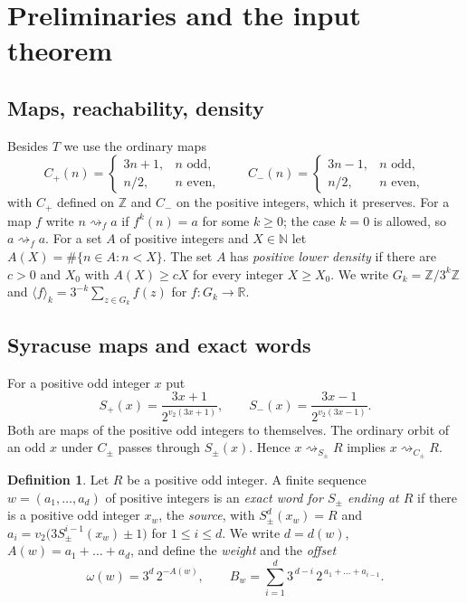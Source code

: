 \documentclass[11pt]{amsart}
\theoremstyle{definition}
\newtheorem{definition}[theorem]{Definition}
\theoremstyle{remark}
\newcommand{\Z}{\mathbb{Z}}
\newcommand{\N}{\mathbb{N}}
\newcommand{\R}{\mathbb{R}}
\newcommand{\Cp}{C_{+}}
\newcommand{\Cm}{C_{-}}
\newcommand{\Sp}{S_{+}}
\newcommand{\Sm}{S_{-}}
\newcommand{\reach}[1]{\mathrel{\rightsquigarrow_{#1}}}
\begin{document}
\section{Preliminaries and the input theorem}\label{sec:prelim}

\subsection{Maps, reachability, density}
Besides $T$ we use the ordinary maps
\[
  \Cp(n)=\begin{cases} 3n+1, & n\text{ odd},\\ n/2, & n\text{ even},\end{cases}\qquad
  \Cm(n)=\begin{cases} 3n-1, & n\text{ odd},\\ n/2, & n\text{ even},\end{cases}
\]
with $\Cp$ defined on $\Z$ and $\Cm$ on the positive integers, which it preserves. For a map $f$
write $n\reach{f}a$ if $f^{k}(n)=a$ for some $k\ge0$; the case $k=0$ is allowed, so $a\reach{f}a$.
For a set $A$ of positive integers and $X\in\N$ let $A(X)=\#\{n\in A: n<X\}$. The set $A$ has
\emph{positive lower density} if there are $c>0$ and $X_0$ with $A(X)\ge cX$ for every integer
$X\ge X_0$. We write $G_k=\Z/3^k\Z$ and $\langle f\rangle_k=3^{-k}\sum_{z\in G_k}f(z)$ for
$f\colon G_k\to\R$.

\subsection{Syracuse maps and exact words}
For a positive odd integer $x$ put
\[
  \Sp(x)=\frac{3x+1}{2^{v_2(3x+1)}},\qquad \Sm(x)=\frac{3x-1}{2^{v_2(3x-1)}} .
\]
Both are maps of the positive odd integers to themselves. The ordinary orbit of an odd $x$ under
$C_\pm$ passes through $S_\pm(x)$. Hence $x\reach{S_\pm}R$ implies $x\reach{C_\pm}R$.

\begin{definition}\label{def:words}
Let $R$ be a positive odd integer. A finite sequence $w=(a_1,\dots,a_d)$ of positive integers is an
\emph{exact word for $S_\pm$ ending at $R$} if there is a positive odd integer $x_w$, the
\emph{source}, with $S_\pm^{d}(x_w)=R$ and $a_i=v_2\bigl(3S_\pm^{i-1}(x_w)\pm1\bigr)$ for
$1\le i\le d$. We write $d=d(w)$, $A(w)=a_1+\dots+a_d$, and define the \emph{weight} and the
\emph{offset}
\[
  \omega(w)=3^{d}\,2^{-A(w)},\qquad
  B_w=\sum_{i=1}^{d}3^{\,d-i}\,2^{\,a_1+\dots+a_{i-1}} .
\]
\end{definition}
\end{document}

